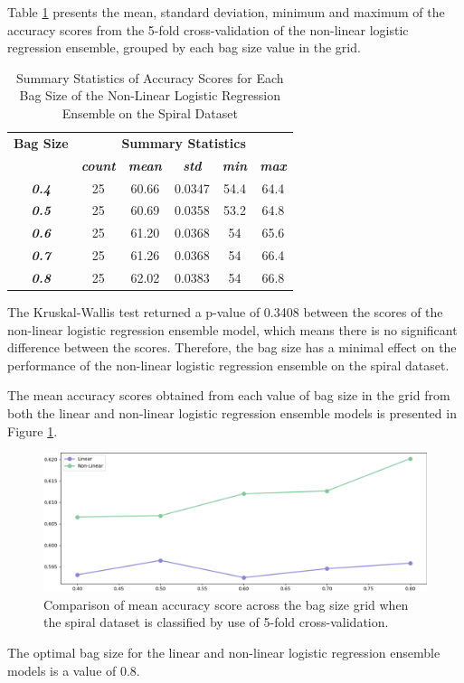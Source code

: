 \documentclass[10pt, conference]{IEEEtran}
\begin{document}
Table \ref{table: S_bagsize_nonlinear_performance_metrics} presents the mean, standard deviation, minimum and maximum of the
accuracy scores from the 5-fold cross-validation of the non-linear logistic regression ensemble, grouped by each bag size
value in the grid.
\begin{table}[H]
    \caption{Summary Statistics of Accuracy Scores for Each Bag Size of the Non-Linear Logistic Regression Ensemble on the Spiral Dataset}
    \begin{center}
        \begin{tabular}{|c||c|c|c|c|c|}
            \hline
            \textbf{Bag Size}&\multicolumn{5}{|c|}{\textbf{Summary Statistics}} \\
            \cline{2-6}
                                &\textbf{\textit{count}} & \textbf{\textit{mean}} & \textbf{\textit{std}} & \textbf{\textit{min}} & \textbf{\textit{max}}\\
            \hline
            \textbf{\textit{0.4}} & 25 & 60.66 & 0.0347 & 54.4 & 64.4 \\
            \textbf{\textit{0.5}} & 25 & 60.69 & 0.0358 & 53.2 & 64.8 \\
            \textbf{\textit{0.6}} & 25 & 61.20 & 0.0368 & 54 & 65.6 \\
            \textbf{\textit{0.7}} & 25 & 61.26 & 0.0368 & 54 & 66.4 \\
            \textbf{\textit{0.8}} & 25 & 62.02 & 0.0383 & 54 & 66.8 \\
            \hline
        \end{tabular}
    \end{center}
    \label{table: S_bagsize_nonlinear_performance_metrics}
\end{table}
The Kruskal-Wallis test returned a p-value of 0.3408 between the scores of the non-linear logistic regression ensemble model,
which means there is no significant difference between the scores. Therefore, the bag size has a minimal effect on the
performance of the non-linear logistic regression ensemble on the spiral dataset.

The mean accuracy scores obtained from each value of bag size in the grid from both the linear and non-linear
logistic regression ensemble models is presented in Figure \ref{fig:S_bag_comparison}.
\begin{figure}[H]
    \centerline{\includegraphics[scale=0.26]{../Images/S_bag.PNG}}
    \caption{Comparison of mean accuracy score across the bag size grid when the spiral dataset is classified by use of 5-fold cross-validation.}
    \label{fig:S_bag_comparison}
\end{figure}
The optimal bag size for the linear and non-linear logistic regression ensemble models is a value of 0.8.
\end{document}
